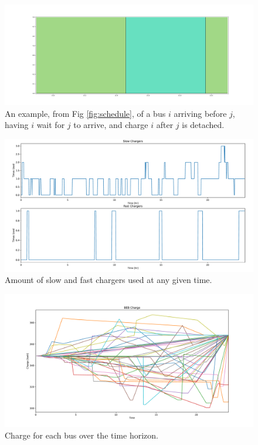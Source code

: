\documentclass[letterpaper, 10pt, conference]{IEEEtran}
\begin{document}
\begin{figure}[ht]
	\centering
	\includegraphics[trim=0in 0in 0in 0in, width=\linewidth]{unoptimal.pdf}
	\caption{An example, from Fig \ref{fig:schedule}, of a bus $i$ arriving before $j$, having $i$ wait for $j$ to arrive, and charge $i$ after $j$ is detached.}
	\label{fig:unoptimal}
\end{figure}

\begin{figure}
	\centering
	\includegraphics[trim=0in 0.25in 0in 0.75in, width=\linewidth]{usage.pdf}
	\caption{Amount of slow and fast chargers used at any given time.}
	\label{fig:usage}
\end{figure}

\begin{figure}
	\centering
	\includegraphics[trim= 0.25in 0in 0.5in 0.25in, width=\linewidth]{charges.pdf}
	\caption{Charge for each bus over the time horizon.}
	\label{fig:charges}
\end{figure}
\end{document}
